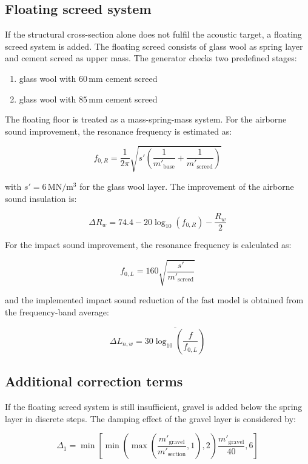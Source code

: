 \documentclass[9pt,a4paper,twocolumn,twoside]{rho-class/rho}
\begin{document}
\subsection{Floating screed system}

If the structural cross-section alone does not fulfil the acoustic target, a floating screed system is added. The floating screed consists of glass wool as spring layer and cement screed as upper mass. The generator checks two predefined stages:

\begin{enumerate}
    \item glass wool with $60\,\mathrm{mm}$ cement screed
    \item glass wool with $85\,\mathrm{mm}$ cement screed
\end{enumerate}

\noindent The floating floor is treated as a mass-spring-mass system. For the airborne sound improvement, the resonance frequency is estimated as:

\[
    f_{0,R}=
    \frac{1}{2\pi}
    \sqrt{
        s'
        \left(
            \frac{1}{m'_{\mathrm{base}}}
            +
            \frac{1}{m'_{\mathrm{screed}}}
        \right)
    }
\]

\noindent with $s'=6\,\mathrm{MN/m^3}$ for the glass wool layer. The improvement of the airborne sound insulation is:

\[
    \Delta R_w =
    74.4
    -
    20 \log_{10}(f_{0,R})
    -
    \frac{R_w}{2}
\]

\noindent For the impact sound improvement, the resonance frequency is calculated as:

\[
    f_{0,L}=160\sqrt{\frac{s'}{m'_{\mathrm{screed}}}}
\]

\noindent and the implemented impact sound reduction of the fast model is obtained from the frequency-band average:

\[
    \Delta L_{n,w}
    =
    \overline{
        30\log_{10}\left(\frac{f}{f_{0,L}}\right)
    }
\]


\subsection{Additional correction terms}

If the floating screed system is still insufficient, gravel is added below the spring layer in discrete steps. The damping effect of the gravel layer is considered by:

\[
    \Delta_1 =
    \min \left[
        \min \left(
            \max \left(
                \frac{m'_{\mathrm{gravel}}}{m'_{\mathrm{section}}},
                1
            \right),
            2
        \right)
        \frac{m'_{\mathrm{gravel}}}{40},
        6
    \right]
\]
\end{document}
